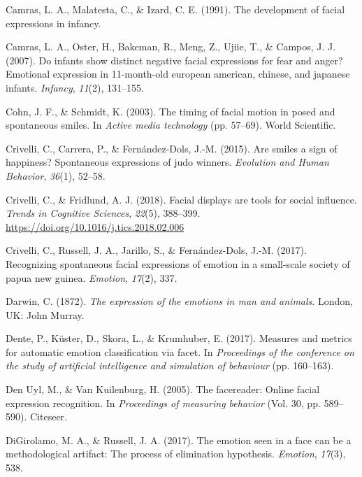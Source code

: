 \documentclass[man]{apa6}
\begin{document}
\leavevmode\hypertarget{ref-camras1991development}{}%
Camras, L. A., Malatesta, C., \& Izard, C. E. (1991). The development of facial expressions in infancy.

\leavevmode\hypertarget{ref-camras2007infants}{}%
Camras, L. A., Oster, H., Bakeman, R., Meng, Z., Ujiie, T., \& Campos, J. J. (2007). Do infants show distinct negative facial expressions for fear and anger? Emotional expression in 11-month-old european american, chinese, and japanese infants. \emph{Infancy}, \emph{11}(2), 131--155.

\leavevmode\hypertarget{ref-cohn2003timing}{}%
Cohn, J. F., \& Schmidt, K. (2003). The timing of facial motion in posed and spontaneous smiles. In \emph{Active media technology} (pp. 57--69). World Scientific.

\leavevmode\hypertarget{ref-crivelli2015smiles}{}%
Crivelli, C., Carrera, P., \& Fernández-Dols, J.-M. (2015). Are smiles a sign of happiness? Spontaneous expressions of judo winners. \emph{Evolution and Human Behavior}, \emph{36}(1), 52--58.

\leavevmode\hypertarget{ref-crivelli2018facial}{}%
Crivelli, C., \& Fridlund, A. J. (2018). Facial displays are tools for social influence. \emph{Trends in Cognitive Sciences}, \emph{22}(5), 388--399. \url{https://doi.org/10.1016/j.tics.2018.02.006}

\leavevmode\hypertarget{ref-crivelli2017recognizing}{}%
Crivelli, C., Russell, J. A., Jarillo, S., \& Fernández-Dols, J.-M. (2017). Recognizing spontaneous facial expressions of emotion in a small-scale society of papua new guinea. \emph{Emotion}, \emph{17}(2), 337.

\leavevmode\hypertarget{ref-darwin1872expression}{}%
Darwin, C. (1872). \emph{The expression of the emotions in man and animals}. London, UK: John Murray.

\leavevmode\hypertarget{ref-dente2017measures}{}%
Dente, P., Küster, D., Skora, L., \& Krumhuber, E. (2017). Measures and metrics for automatic emotion classification via facet. In \emph{Proceedings of the conference on the study of artificial intelligence and simulation of behaviour} (pp. 160--163).

\leavevmode\hypertarget{ref-den2005facereader}{}%
Den Uyl, M., \& Van Kuilenburg, H. (2005). The facereader: Online facial expression recognition. In \emph{Proceedings of measuring behavior} (Vol. 30, pp. 589--590). Citeseer.

\leavevmode\hypertarget{ref-digirolamo2017emotion}{}%
DiGirolamo, M. A., \& Russell, J. A. (2017). The emotion seen in a face can be a methodological artifact: The process of elimination hypothesis. \emph{Emotion}, \emph{17}(3), 538.
\end{document}
